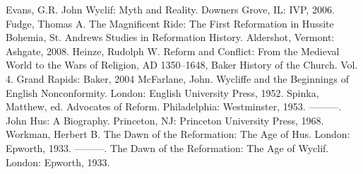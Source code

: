 \begin{readinglist}
\entry *Evans, G.R. John Wyclif: Myth and Reality. Downers Grove, IL: IVP, 2006.
\entry *Fudge, Thomas A. The Magnificent Ride: The First Reformation in Hussite Bohemia, St. Andrews
  Studies in Reformation History. Aldershot, Vermont: Ashgate, 2008.
\entry Heinze, Rudolph W. Reform and Conflict: From the Medieval World to the Wars of Religion, AD
  1350–1648, Baker History of the Church. Vol. 4. Grand Rapids: Baker, 2004
\entry McFarlane, John. Wycliffe and the Beginnings of English Nonconformity. London: English
  University Press, 1952.
\entry Spinka, Matthew, ed. Advocates of Reform. Philadelphia: Westminster, 1953.
\entry ———. John Hus: A Biography. Princeton, NJ: Princeton University Press, 1968.
\entry Workman, Herbert B. The Dawn of the Reformation: The Age of Hus. London: Epworth, 1933.
\entry ———. The Dawn of the Reformation: The Age of Wyclif. London: Epworth, 1933.
\end{readinglist}
